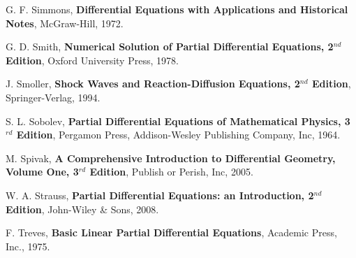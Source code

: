 \begin{thebibliography}{99}
 G. F. Simmons, {\bfseries Differential Equations with
Applications and Historical Notes}, McGraw-Hill, 1972. 

 G. D. Smith,
{\bfseries Numerical Solution of Partial Differential Equations,
2$^{nd}$ Edition}, Oxford University Press, 1978. 

 J. Smoller,
{\bfseries Shock Waves and Reaction-Diffusion Equations, 2$^{nd}$ Edition},
Springer-Verlag, 1994.

 S. L. Sobolev,
{\bfseries Partial Differential Equations of Mathematical Physics,
3$^{rd}$ Edition}, Pergamon Press, Addison-Wesley Publishing Company,
Inc, 1964.

 M. Spivak,
{\bfseries A Comprehensive Introduction to Differential Geometry,
  Volume One, 3$^{rd}$ Edition}, Publish or Perish, Inc, 2005. 

 W. A. Strauss,
{\bfseries Partial Differential Equations: an Introduction, 2$^{nd}$ Edition},
John-Wiley \& Sons, 2008.

 F. Treves,
{\bfseries Basic Linear Partial Differential Equations},
Academic Press, Inc., 1975.

\end{thebibliography}

